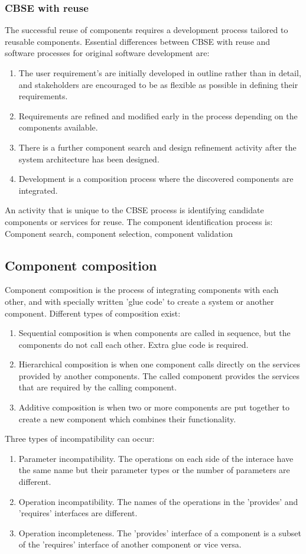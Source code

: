 \documentclass{article}
\begin{document}
\subsubsection{CBSE with reuse}
The successful reuse of components requires a development process tailored to reusable components.
Essential differences between CBSE with reuse and software processes for original software development are:
\begin{enumerate}
\item The user requirement's are initially developed in outline rather than in detail, and stakeholders are encouraged to be as flexible as possible in defining their requirements.
\item Requirements are refined and modified early in the process depending on the components available.
\item There is a further component search and design refinement activity after the system architecture has been designed.
\item Development is a composition process where the discovered components are integrated.
\end{enumerate}
An activity that is unique to the CBSE process is identifying candidate components or services for reuse.
The component identification process is: Component search, component selection, component validation

\subsection{Component composition}
Component composition is the process of integrating components with each other, and with specially written 'glue code' to create a system or another component.
Different types of composition exist:
\begin{enumerate}
\item Sequential composition is when components are called in sequence, but the components do not call each other.  Extra glue code is required.
\item Hierarchical composition is when one component calls directly on the services provided by another components.  The called component provides the services that are required by the calling component.
\item Additive composition is when two or more components are put together to create a new component which combines their functionality.
\end{enumerate}
Three types of incompatibility can occur:
\begin{enumerate}
\item Parameter incompatibility.  The operations on each side of the interace have the same name but their parameter types or the number of parameters are different.
\item Operation incompatibility.  The names of the operations in the 'provides' and 'requires' interfaces are different.
\item Operation incompleteness.  The 'provides' interface of a component is a subset of the 'requires' interface of another component or vice versa.
\end{enumerate}
\end{document}
